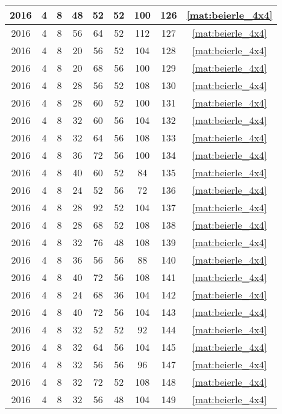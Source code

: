 \begin{longtable}{|c|c|c|c|c|c|c|c|c|}
2016 & 4 & 8 & 48 & 52 & 52 & 100 & 126 & \eqref{mat:beierle_4x4} \\ \hline 
2016 & 4 & 8 & 56 & 64 & 52 & 112 & 127 & \eqref{mat:beierle_4x4} \\ \hline 
2016 & 4 & 8 & 20 & 56 & 52 & 104 & 128 & \eqref{mat:beierle_4x4} \\ \hline 
2016 & 4 & 8 & 20 & 68 & 56 & 100 & 129 & \eqref{mat:beierle_4x4} \\ \hline 
2016 & 4 & 8 & 28 & 56 & 52 & 108 & 130 & \eqref{mat:beierle_4x4} \\ \hline 
2016 & 4 & 8 & 28 & 60 & 52 & 100 & 131 & \eqref{mat:beierle_4x4} \\ \hline 
2016 & 4 & 8 & 32 & 60 & 56 & 104 & 132 & \eqref{mat:beierle_4x4} \\ \hline 
2016 & 4 & 8 & 32 & 64 & 56 & 108 & 133 & \eqref{mat:beierle_4x4} \\ \hline 
2016 & 4 & 8 & 36 & 72 & 56 & 100 & 134 & \eqref{mat:beierle_4x4} \\ \hline 
2016 & 4 & 8 & 40 & 60 & 52 & 84 & 135 & \eqref{mat:beierle_4x4} \\ \hline 
2016 & 4 & 8 & 24 & 52 & 56 & 72 & 136 & \eqref{mat:beierle_4x4} \\ \hline 
2016 & 4 & 8 & 28 & 92 & 52 & 104 & 137 & \eqref{mat:beierle_4x4} \\ \hline 
2016 & 4 & 8 & 28 & 68 & 52 & 108 & 138 & \eqref{mat:beierle_4x4} \\ \hline 
2016 & 4 & 8 & 32 & 76 & 48 & 108 & 139 & \eqref{mat:beierle_4x4} \\ \hline 
2016 & 4 & 8 & 36 & 56 & 56 & 88 & 140 & \eqref{mat:beierle_4x4} \\ \hline 
2016 & 4 & 8 & 40 & 72 & 56 & 108 & 141 & \eqref{mat:beierle_4x4} \\ \hline 
2016 & 4 & 8 & 24 & 68 & 36 & 104 & 142 & \eqref{mat:beierle_4x4} \\ \hline 
2016 & 4 & 8 & 40 & 72 & 56 & 104 & 143 & \eqref{mat:beierle_4x4} \\ \hline 
2016 & 4 & 8 & 32 & 52 & 52 & 92 & 144 & \eqref{mat:beierle_4x4} \\ \hline 
2016 & 4 & 8 & 32 & 64 & 56 & 104 & 145 & \eqref{mat:beierle_4x4} \\ \hline 
2016 & 4 & 8 & 32 & 56 & 56 & 96 & 147 & \eqref{mat:beierle_4x4} \\ \hline 
2016 & 4 & 8 & 32 & 72 & 52 & 108 & 148 & \eqref{mat:beierle_4x4} \\ \hline 
2016 & 4 & 8 & 32 & 56 & 48 & 104 & 149 & \eqref{mat:beierle_4x4} \\ \hline 

\end{longtable}
